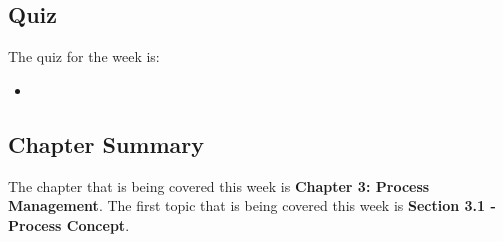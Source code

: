 \subsection{Quiz}

The quiz for the week is:

\begin{itemize}
    \item {}
\end{itemize}

\newpage

\subsection{Chapter Summary}

The chapter that is being covered this week is \textbf{Chapter 3: Process Management}. The first topic that is being covered this week is \textbf{Section 3.1 - Process Concept}.

